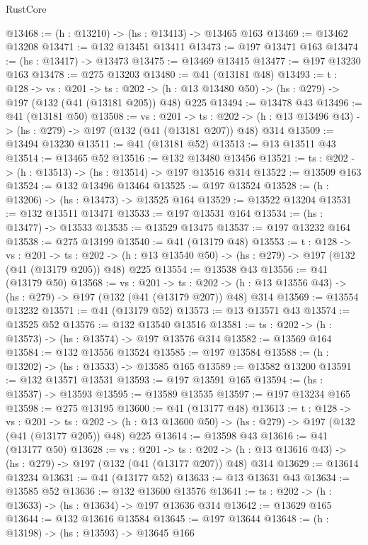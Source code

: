 \begin{lexlean}{RustCore}
\begin{coremodule}
@13468 := (h : @13210) -> (hs : @13413) -> @13465 @163
@13469 := @13462 @13208
@13471 := @132 @13451 @13411
@13473 := @197 @13471 @163
@13474 := (hs : @13417) -> @13473
@13475 := @13469 @13415
@13477 := @197 @13230 @163
@13478 := @275 @13203
@13480 := @41 (@13181 @48)
@13493 := {t : @128} ->
  {vs : @201} ->
  {ts : @202} -> (h : @13 @13480 @50) -> (hs : @279) -> @197 (@132 (@41 (@13181 @205)) @48) @225
@13494 := @13478 @43
@13496 := @41 (@13181 @50)
@13508 := {vs : @201} ->
  {ts : @202} -> (h : @13 @13496 @43) -> (hs : @279) -> @197 (@132 (@41 (@13181 @207)) @48) @314
@13509 := @13494 @13230
@13511 := @41 (@13181 @52)
@13513 := @13 @13511 @43
@13514 := @13465 @52
@13516 := @132 @13480 @13456
@13521 := {ts : @202} -> (h : @13513) -> (hs : @13514) -> @197 @13516 @314
@13522 := @13509 @163
@13524 := @132 @13496 @13464
@13525 := @197 @13524
@13528 := (h : @13206) -> (hs : @13473) -> @13525 @164
@13529 := @13522 @13204
@13531 := @132 @13511 @13471
@13533 := @197 @13531 @164
@13534 := (hs : @13477) -> @13533
@13535 := @13529 @13475
@13537 := @197 @13232 @164
@13538 := @275 @13199
@13540 := @41 (@13179 @48)
@13553 := {t : @128} ->
  {vs : @201} ->
  {ts : @202} -> (h : @13 @13540 @50) -> (hs : @279) -> @197 (@132 (@41 (@13179 @205)) @48) @225
@13554 := @13538 @43
@13556 := @41 (@13179 @50)
@13568 := {vs : @201} ->
  {ts : @202} -> (h : @13 @13556 @43) -> (hs : @279) -> @197 (@132 (@41 (@13179 @207)) @48) @314
@13569 := @13554 @13232
@13571 := @41 (@13179 @52)
@13573 := @13 @13571 @43
@13574 := @13525 @52
@13576 := @132 @13540 @13516
@13581 := {ts : @202} -> (h : @13573) -> (hs : @13574) -> @197 @13576 @314
@13582 := @13569 @164
@13584 := @132 @13556 @13524
@13585 := @197 @13584
@13588 := (h : @13202) -> (hs : @13533) -> @13585 @165
@13589 := @13582 @13200
@13591 := @132 @13571 @13531
@13593 := @197 @13591 @165
@13594 := (hs : @13537) -> @13593
@13595 := @13589 @13535
@13597 := @197 @13234 @165
@13598 := @275 @13195
@13600 := @41 (@13177 @48)
@13613 := {t : @128} ->
  {vs : @201} ->
  {ts : @202} -> (h : @13 @13600 @50) -> (hs : @279) -> @197 (@132 (@41 (@13177 @205)) @48) @225
@13614 := @13598 @43
@13616 := @41 (@13177 @50)
@13628 := {vs : @201} ->
  {ts : @202} -> (h : @13 @13616 @43) -> (hs : @279) -> @197 (@132 (@41 (@13177 @207)) @48) @314
@13629 := @13614 @13234
@13631 := @41 (@13177 @52)
@13633 := @13 @13631 @43
@13634 := @13585 @52
@13636 := @132 @13600 @13576
@13641 := {ts : @202} -> (h : @13633) -> (hs : @13634) -> @197 @13636 @314
@13642 := @13629 @165
@13644 := @132 @13616 @13584
@13645 := @197 @13644
@13648 := (h : @13198) -> (hs : @13593) -> @13645 @166

\end{coremodule}
\end{lexlean}
